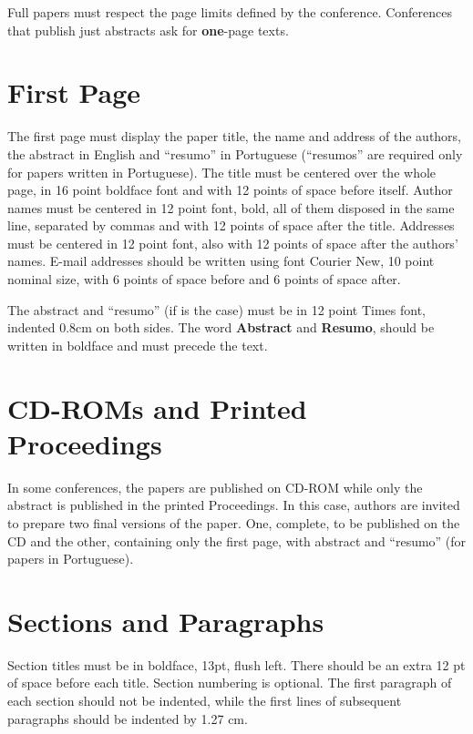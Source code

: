 \documentclass[12pt]{article}
\begin{document}
Full papers must respect the page limits defined by the conference.
Conferences that publish just abstracts ask for \textbf{one}-page texts.

\section{First Page} \label{sec:firstpage}

The first page must display the paper title, the name and address of the
authors, the abstract in English and ``resumo'' in Portuguese (``resumos'' are
required only for papers written in Portuguese). The title must be centered
over the whole page, in 16 point boldface font and with 12 points of space
before itself. Author names must be centered in 12 point font, bold, all of
them disposed in the same line, separated by commas and with 12 points of
space after the title. Addresses must be centered in 12 point font, also with
12 points of space after the authors' names. E-mail addresses should be
written using font Courier New, 10 point nominal size, with 6 points of space
before and 6 points of space after.

The abstract and ``resumo'' (if is the case) must be in 12 point Times font,
indented 0.8cm on both sides. The word \textbf{Abstract} and \textbf{Resumo},
should be written in boldface and must precede the text.

\section{CD-ROMs and Printed Proceedings}

In some conferences, the papers are published on CD-ROM while only the
abstract is published in the printed Proceedings. In this case, authors are
invited to prepare two final versions of the paper. One, complete, to be
published on the CD and the other, containing only the first page, with
abstract and ``resumo'' (for papers in Portuguese).

\section{Sections and Paragraphs}

Section titles must be in boldface, 13pt, flush left. There should be an extra
12 pt of space before each title. Section numbering is optional. The first
paragraph of each section should not be indented, while the first lines of
subsequent paragraphs should be indented by 1.27 cm.
\end{document}
